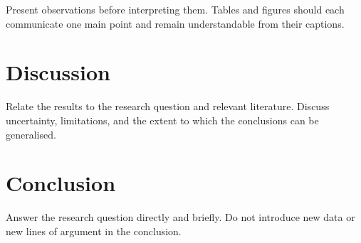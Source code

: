 \documentclass[masters,en,book,11pt,departmentcolour=OUES]{OU}
\begin{document}
Present observations before interpreting them.
Tables and figures should each communicate one main point and remain understandable from their captions.

\lipsum[45-60]

\chapter{Discussion}

Relate the results to the research question and relevant literature.
Discuss uncertainty, limitations, and the extent to which the conclusions can be generalised.

\lipsum[61-76]

\chapter{Conclusion}

Answer the research question directly and briefly.
Do not introduce new data or new lines of argument in the conclusion.

\lipsum[77-90]

\end{document}
